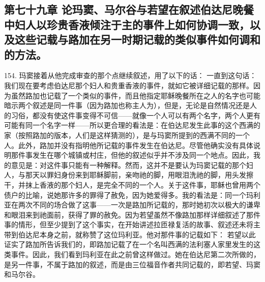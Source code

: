 
\subsection{第七十九章 论玛窦、马尔谷与若望在叙述伯达尼晚餐中妇人以珍贵香液倾注于主的事件上如何协调一致，以及这些记载与路加在另一时期记载的类似事件如何调和的方法。}

154. 玛窦接着从他完成审查的那个点继续叙述，用了以下的话： 一直到这句话： 我们现在要考虑伯达尼那个妇人和贵重香液的事件，就如它被详细记载的那样。因为虽然路加也记载了一个类似的事件，而且他指定耶稣晚餐所在之人的名字也可能暗示两个叙述是同一件事（因为路加也称主人为），但是，无论是自然情况还是人的习俗，都没有使这件事变得不可信——就像一个人可以有两个名字，两个人更有可能有同一个名字一样——所以更合理的看法是：在伯达尼发生此事的这个西满的家（按照路加的版本，人们是这样猜测的），是与玛窦所提到的西满不同的一个人。此外，路加并没有指明他所记载的事件发生在伯达尼。尽管他确实没有具体说明那件事发生在哪个城镇或村庄，但他的叙述似乎并不涉及同一个地点。因此，我的意见是：对这件事只能有一种解释。然而，这并不是要认为玛窦记载的那个妇人，与那天以罪妇身份来到耶稣脚前，亲吻祂的脚，用眼泪洗祂的脚，用头发擦干，并抹上香液的那个妇人，是完全不同的一个人。关于这件事，耶稣也曾用两个债户的比喻，说她那许多的罪得了赦免，因为她爱得多。我的看法是：同一个玛利亚在两次不同的场合做了这事——一次是路加所记载的，那时她初次以极大的谦卑和眼泪来到祂面前，获得了罪的赦免。因为若望虽然不像路加那样详细叙述了那件事的情形，但至少提到了这个事实，在开始讲述拉匝禄复活的故事、叙述还未将主带到伯达尼本身之前，就称赞了这位玛利亚。他对那件事的记载如下： 若望以此证实了路加所告诉我们的，即路加记载了在一个名叫西满的法利塞人家里发生的这类事件。因此，我们看到玛利亚在此之前曾这样做过。她在伯达尼第二次所做的，是另一件事，不属于路加的叙述，而是由三位福音作者共同记载的，即若望、玛窦和马尔谷。\par

